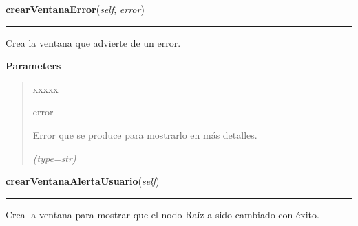     \vspace{0.5ex}

\hspace{.8\funcindent}\begin{boxedminipage}{\funcwidth}

    \raggedright \textbf{crearVentanaError}(\textit{self}, \textit{error})

    \vspace{-1.5ex}

    \rule{\textwidth}{0.5\fboxrule}
\setlength{\parskip}{2ex}
    Crea la ventana que advierte de un error.

\setlength{\parskip}{1ex}
      \textbf{Parameters}
      \vspace{-1ex}

      \begin{quote}
        \begin{Ventry}{xxxxx}

          \item[error]

          Error que se produce para mostrarlo en más detalles.

            {\it (type=str)}

        \end{Ventry}

      \end{quote}

    \end{boxedminipage}

    \label{creaVentanas:CreaVentanas:crearVentanaAlertaUsuario}

    \vspace{0.5ex}

\hspace{.8\funcindent}\begin{boxedminipage}{\funcwidth}

    \raggedright \textbf{crearVentanaAlertaUsuario}(\textit{self})

    \vspace{-1.5ex}

    \rule{\textwidth}{0.5\fboxrule}
\setlength{\parskip}{2ex}
    Crea la ventana para mostrar que el nodo Raíz a sido cambiado con 
    éxito.

\setlength{\parskip}{1ex}
    \end{boxedminipage}

